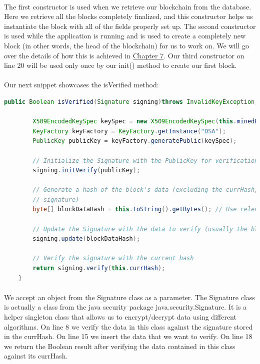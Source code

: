 \documentclass[12pt,a4paper]{report}
\begin{document}
\paragraph{}
The first constructor is used when we retrieve our blockchain from 
the database. Here we retrieve all the blocks completely finalized, and this 
constructor helps us instantiate the block with all of the fields properly 
set up. The second constructor is used while the application is running 
and is used to create a completely new block (in other words, the head of 
the blockchain) for us to work on. We will go over the details of how this is 
achieved in \hyperref[chapter Service Layer]{Chapter 7}. Our third constructor on line 20 will be used only once by our init() method to create our first block.
\paragraph{}
Our next snippet showcases the isVerified method:
\begin{lstlisting}[language=Java]
    public Boolean isVerified(Signature signing)throws InvalidKeyException, SignatureException, NoSuchAlgorithmException, InvalidKeySpecException {

        X509EncodedKeySpec keySpec = new X509EncodedKeySpec(this.minedBy);
        KeyFactory keyFactory = KeyFactory.getInstance("DSA");
        PublicKey publicKey = keyFactory.generatePublic(keySpec);

        // Initialize the Signature with the PublicKey for verification
        signing.initVerify(publicKey);

        // Generate a hash of the block's data (excluding the currHash, which is the
        // signature)
        byte[] blockDataHash = this.toString().getBytes(); // Use relevant block data to hash

        // Update the Signature with the data to verify (usually the block data or hash)
        signing.update(blockDataHash);

        // Verify the signature with the current hash
        return signing.verify(this.currHash);
    }
\end{lstlisting}
\paragraph{}
We accept an object from the Signature class as a parameter. The Signature class is actually a class from the java security package java.security.Signature. It is a helper singleton class that allows us to encrypt/decrypt data using different algorithms. On line 8 we verify the data in this class against the signature stored in the currHash. On line 15 we insert the data that we want to verify. On line 18 we return the Boolean result after verifying the data contained in this class against its currHash.
\end{document}
